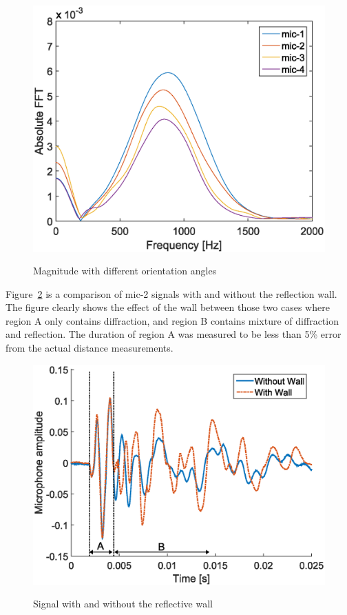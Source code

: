 \documentclass[letterpaper, 10 pt, conference]{ieeeconf}  %
\begin{document}
\begin{figure}[thpb]
    {\centering
    \includegraphics[width = 0.8\columnwidth]{Figures/frequency_first_peaks.eps}
    }    
    \caption{Magnitude with different orientation angles}\label{fig:EnergyAngle}
\end{figure}

Figure~\ref{fig:dr_compare} is a comparison of mic-2 signals with and without the reflection wall. The figure clearly shows the effect of the wall between those two cases where region A only contains diffraction, and region B contains mixture of diffraction and reflection. The duration of region A was measured to be less than 5\% error from the actual distance measurements.

\begin{figure}[thpb]
    {\centering
    \includegraphics[width = 0.8\columnwidth]{Figures/signal_withwithout_wall.eps}
    }
    \caption{Signal with and without the reflective wall}
    \label{fig:dr_compare}    
\end{figure}
\end{document}
